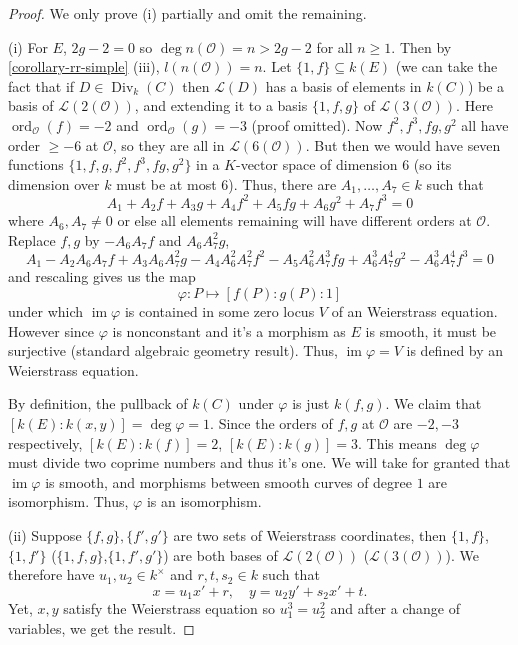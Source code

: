 \documentclass[12pt]{article}
\theoremstyle{remark}
\theoremstyle{definition}
\newcommand{\ord}[0]{\operatorname{ord}}
\newcommand{\ecO}[0]{\mathcal O}
\newcommand{\im}[0]{\operatorname{im}}
\newcommand{\Div}[0]{\operatorname{Div}}
\begin{document}
            \begin{proof}
                We only prove (i) partially and omit the remaining.
                
                (i) For $E$, $2g-2=0$ so $\deg n(\mathcal O)=n>2g-2$ for all $n\geqslant 1$. Then by \autoref{corollary-rr-simple} (iii), $l(n(\mathcal O))=n$. Let $\{1, f\}\subseteq k(E)$ (we can take the fact that if $D\in\Div_k(C)$ then $\mathcal L(D)$ has a basis of elements in $k(C)$) be a basis of $\mathcal L(2(\mathcal O))$, and extending it to a basis $\{1,f,g\}$ of $\mathcal L(3(\mathcal O))$. Here $\ord_{\mathcal O}(f)=-2$ and $\ord_{\mathcal O}(g)=-3$ (proof omitted). Now $f^2, f^3, fg, g^2$ all have order $\geqslant -6$ at $\mathcal O$, so they are all in $\mathcal L(6(\mathcal O))$. But then we would have seven functions $\{1,f,g,f^2,f^3,fg,g^2\}$ in a $K$-vector space of dimension $6$ (so its dimension over $k$ must be at most $6$). Thus, there are $A_1,\dots, A_7\in k$ such that
                \[A_1+A_2f+A_3g+A_4f^2+A_5fg+A_6g^2+A_7f^3=0\]
                where $A_6,A_7\neq 0$ or else all elements remaining will have different orders at $\mathcal O$. Replace $f,g$ by $-A_6A_7f$ and $A_6A_7^2g$,
                \[A_1-A_2A_6A_7f+A_3A_6A_7^2g-A_4A_6^2A_7^2f^2-A_5A_6^2A_7^3fg+A_6^3A_7^4g^2-A_6^3A_7^4f^3=0\]
                and rescaling gives us the map
                \[\varphi:P\mapsto[f(P):g(P):1]\]
                under which $\im \varphi$ is contained in some zero locus $V$ of an Weierstrass equation. However since $\varphi$ is nonconstant and it's a morphism as $E$ is smooth, it must be surjective (standard algebraic geometry result). Thus, $\im \varphi=V$ is defined by an Weierstrass equation.
                
                By definition, the pullback of $k(C)$ under $\varphi$ is just $k(f, g)$. We claim that $[k(E):k(x, y)]=\deg \varphi=1$. Since the orders of $f, g$ at $\mathcal O$ are $-2,-3$ respectively, $[k(E):k(f)]=2$, $[k(E):k(g)]=3$. This means $\deg\varphi$ must divide two coprime numbers and thus it's one. We will take for granted that $\im\varphi$ is smooth, and morphisms between smooth curves of degree $1$ are isomorphism. Thus, $\varphi$ is an isomorphism.
                
                (ii) Suppose $\{f,g\},\{f',g'\}$ are two sets of Weierstrass coordinates, then $\{1,f\}$, $\{1,f'\}$ ($\{1,f,g\}$,$\{1,f',g'\}$) are both bases of $\mathcal L(2(\ecO))$ ($\mathcal L(3(\ecO))$). We therefore have $u_1,u_2\in k^\times$ and $r, t, s_2\in k$ such that 
                \[x=u_1x'+r,\quad y=u_2y'+s_2x'+t.\]
                Yet, $x, y$ satisfy the Weierstrass equation so $u_1^3=u_2^2$ and after a change of variables, we get the result.
                

\end{proof}
\end{document}
